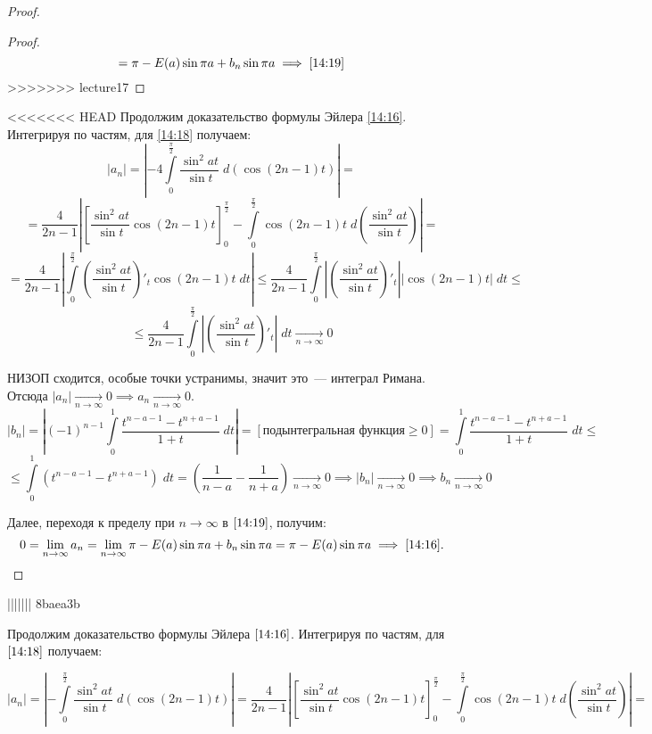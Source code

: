 \documentclass[../../main.tex]{subfiles}
\begin{document}
\begin{proof}
\begin{proof}
				\[ = \pi - E(a) \sin{\pi a} + b_n \sin{\pi a} \implies \eqref{14:19}      
				\]
>>>>>>> lecture17
			\end{proof}	
			
<<<<<<< HEAD
		Продолжим доказательство формулы Эйлера \eqref{14:16}. Интегрируя по 
		частям, для \eqref{14:18} получаем:
		\[  \left| a_n \right|   = \left| -4 \int\limits_{0}^{\frac{\pi}{2}} 
		\frac{\sin^2{at}}{\sin{t}} \; d\left( \cos{(2n-1)t}\right)   \right|  =\]
		\[ = \frac{4}{2n-1} \left| \left[ \frac{\sin^2{at}}{\sin{t}} \cos{(2n-1)t} 
		\right]_{0}^{\frac{\pi}{2}} -\int\limits_{0}^{\frac{\pi}{2}} \cos{(2n-1)t} 
		\; d\left( \frac{\sin^2{at}}{\sin{t}} \right)   \right| =     \]
		\[  = \frac{4}{2n-1}\left| \int\limits_{0}^{\frac{\pi}{2}} \left( 
		\frac{\sin^2{at}}{\sin{t}} \right)'_t \cos{(2n-1)t} \; dt \right|  \le  
		\frac{4}{2n-1} \int\limits_{0}^{\frac{\pi}{2}} \left| \left( 
		\frac{\sin^2{at}}{\sin{t}} \right)'_t \right| \left|\cos{(2n-1)t}\right| \; 
		dt  \le\]
		\[ \le \frac{4}{2n-1} \int\limits_{0}^{\frac{\pi}{2}} \left| \left( 
		\frac{\sin^2{at}}{\sin{t}} \right)'_t \right| \; dt  {\underset{n \to 
		\infty}\rightarrow} 0 \]
		
		НИЗОП сходится, особые точки устранимы, значит это~--- интеграл Римана. 
		Отсюда 
		$\left| a_n \right|{\underset{n \to \infty}\longrightarrow} 0 \implies   a_n 
		{\underset{n \to \infty}\longrightarrow} 0$.
		\[  \left| b_n \right| = \left| (-1)^{n-1} \int\limits_{0}^{1} 
		\frac{t^{n-a-1} - t^{n+a-1}}{1+t} \; dt \right| = \left[
		\text{подынтегральная функция} \ge 0 \right] =  \int\limits_{0}^{1} 
		\frac{t^{n-a-1} - t^{n+a-1}}{1+t} \; dt \le  \]
		\[  \le \int\limits_{0}^{1} (t^{n-a-1} - t^{n+a-1})\; dt = \left(  
		\frac{1}{n-a} - \frac{1}{n+a}\right)  {\underset{n \to 
		\infty}\longrightarrow} 0  \implies  \left| b_n \right| {\underset{n \to 
		\infty}\longrightarrow} 0  \implies   b_n  {\underset{n \to 
		\infty}\longrightarrow} 0  \]
		
		Далее, переходя к пределу при $n \to \infty$ в $\eqref{14:19}$, получим:
		\[ 0 = \lim_{n \to \infty} a_n =  \lim_{n \to \infty} \pi - E(a) \sin{\pi a} 
		+ 
		b_n \sin{\pi a} = \pi - E(a) \sin{\pi a} \implies \eqref{14:16}. \qedhere\]
\end{proof}
||||||| 8baea3b
			
	
		Продолжим доказательство формулы Эйлера $\eqref{14:16}$. Интегрируя по частям, для $\eqref{14:18}$ получаем:
		
		\[  \left| a_n \right|   = \left| - \int\limits_{0}^{\frac{\pi}{2}} \frac{\sin^2{at}}{\sin{t}} \; d\left( \cos{(2n-1)t}\right)   \right|  =  
		\frac{4}{2n-1} \left| \left[ \frac{\sin^2{at}}{\sin{t}} \cos{(2n-1)t} \right]_{0}^{\frac{\pi}{2}} -\int\limits_{0}^{\frac{\pi}{2}} \cos{(2n-1)t} \; d\left( \frac{\sin^2{at}}{\sin{t}} \right)   \right| =     \]
		
\end{document}
